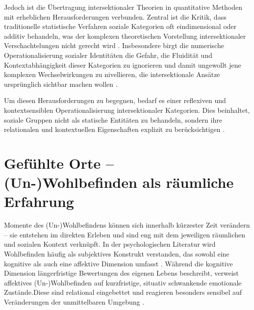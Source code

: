 Jedoch ist die Übertragung intersektionaler Theorien in quantitative Methoden mit erheblichen Herausforderungen verbunden. Zentral ist die Kritik, dass traditionelle statistische Verfahren soziale Kategorien oft eindimensional oder additiv behandeln, was der komplexen theoretischen Vorstellung intersektionaler Verschachtelungen nicht gerecht wird \parencite{hancockWhenMultiplicationDoesnt2007, bowlegInvitedReflectionQuantifying2016}. Insbesondere birgt die numerische Operationalisierung sozialer Identitäten die Gefahr, die Fluidität und Kontextabhängigkeit dieser Kategorien zu ignorieren und damit ungewollt jene komplexen Wechselwirkungen zu nivellieren, die intersektionale Ansätze ursprünglich sichtbar machen wollen \parencite{scottIntersectionalityQuantitativeMethods2017}.

Um diesen Herausforderungen zu begegnen, bedarf es einer reflexiven und kontextsensiblen Operationalisierung intersektionaler Kategorien. Dies beinhaltet, soziale Gruppen nicht als statische Entitäten zu behandeln, sondern ihre relationalen und kontextuellen Eigenschaften explizit zu berücksichtigen \parencite{rodo-de-zarateDevelopingGeographiesIntersectionality2014, websterCenteringSocialtechnicalRelations2021}.


\section{Gefühlte Orte -- (Un-)Wohlbefinden als räumliche Erfahrung} %

Momente des (Un-)Wohlbefindens können sich innerhalb kürzester Zeit verändern -- sie entstehen im direkten Erleben und sind eng mit dem jeweiligen räumlichen und sozialen Kontext verknüpft. In der psychologischen Literatur wird Wohlbefinden häufig als subjektives Konstrukt verstanden, das sowohl eine kognitive als auch eine affektive Dimension umfasst \parencite{dodgeChallengeDefiningWellbeing2012}. Während die kognitive Dimension längerfristige Bewertungen des eigenen Lebens beschreibt, verweist affektives (Un-)Wohlbefinden auf kurzfristige, situativ schwankende emotionale Zustände.\footnotemark Diese sind relational eingebettet und reagieren besonders sensibel auf Veränderungen der unmittelbaren Umgebung \parencite{dodgeChallengeDefiningWellbeing2012}.


